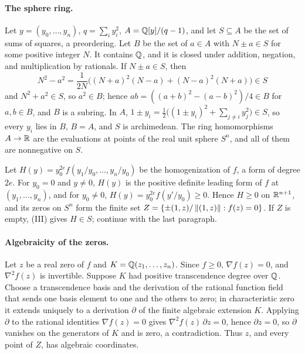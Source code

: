 \paragraph{The sphere ring.}
Let $y=(y_0,\ldots,y_n)$, $q=\sum_iy_i^2$, $A=\mathbb Q[y]/(q-1)$, and let
$S\subseteq A$ be the set of sums of squares, a preordering. Let $B$ be the
set of $a\in A$ with $N\pm a\in S$ for some positive integer $N$. It contains $\mathbb Q$,
and it is closed under addition, negation, and multiplication by rationals.
If $N\pm a\in S$, then
\[
 N^2-a^2=\frac1{2N}\bigl((N+a)^2(N-a)+(N-a)^2(N+a)\bigr)\in S
\]
and $N^2+a^2\in S$, so $a^2\in B$; hence $ab=((a+b)^2-(a-b)^2)/4\in B$ for
$a,b\in B$, and $B$ is a subring. In $A$,
$1\pm y_i=\frac12\bigl((1\pm y_i)^2+\sum_{j\ne i}y_j^2\bigr)\in S$, so every
$y_i$ lies in $B$, $B=A$, and $S$ is archimedean. The ring homomorphisms
$A\to\mathbb R$ are the evaluations at points of the real unit sphere $S^n$, and all
of them are nonnegative on $S$.

Let $H(y)=y_0^{2e}f(y_1/y_0,\ldots,y_n/y_0)$ be the homogenization of $f$,
a form of degree $2e$. For $y_0=0$ and $y\ne0$, $H(y)$ is the positive
definite leading form of $f$ at $(y_1,\ldots,y_n)$, and for $y_0\ne0$,
$H(y)=y_0^{2e}f(y'/y_0)\ge0$. Hence $H\ge0$ on $\mathbb R^{n+1}$, and its zeros on
$S^n$ form the finite set $Z=\{\pm(1,z)/\left\lVert(1,z)\right\rVert:f(z)=0\}$. If $Z$ is
empty, (III) gives $H\in S$; continue with the last paragraph.

\paragraph{Algebraicity of the zeros.}
Let $z$ be a real zero of $f$ and $K=\mathbb Q(z_1,\ldots,z_n)$. Since $f\ge0$,
$\nabla f(z)=0$, and $\nabla^2f(z)$ is invertible. Suppose $K$ had positive
transcendence degree over $\mathbb Q$. Choose a transcendence basis and the
derivation of the rational function field that sends one basis element to
one and the others to zero; in characteristic zero it extends uniquely to a
derivation $\partial$ of the finite algebraic extension $K$. Applying
$\partial$ to the rational identities $\nabla f(z)=0$ gives
$\nabla^2f(z)\,\partial z=0$, hence $\partial z=0$, so $\partial$ vanishes on
the generators of $K$ and is zero, a contradiction. Thus $z$, and every point
of $Z$, has algebraic coordinates.

